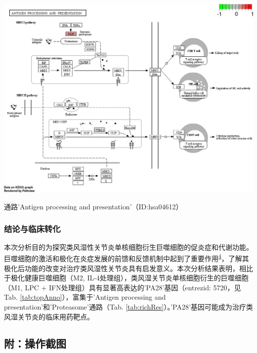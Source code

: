 \documentclass[
]{article}
\begin{document}
\bgroup {}
\includegraphics[width=14.88in]{thesis_fig/hsa04612.pathview} \caption{通路'Antigen processing and presentation'（ID:hsa04612）}\label{fig:fig10}
\makeatletter \egroup

\hypertarget{ux7ed3ux8bbaux4e0eux4e34ux5e8aux8f6cux5316}{%
\subsubsection{结论与临床转化}\label{ux7ed3ux8bbaux4e0eux4e34ux5e8aux8f6cux5316}}

本次分析目的为探究类风湿性关节炎单核细胞衍生巨噬细胞的促炎症和代谢功能。巨噬细胞的激活和极化在炎症发展的前馈和反馈机制中起到了重要作用\textsuperscript{\protect\hyperlink{ref-hu_regulation_2008}{4}}，了解其极化后功能的改变对治疗类风湿性关节炎具有启发意义。本次分析结果表明，相比于极化健康巨噬细胞（M2, IL-4处理组），类风湿关节炎单核细胞衍生的巨噬细胞（M1, LPC + IFN处理组）具有显著高表达的'PA28'基因（entrezid: 5720，见Tab. \ref{tab:topAnno}），富集于'Antigen processing and presentation'和'Proteasome'通路（Tab. \ref{tab:richRes}）。'PA28'基因可能成为治疗类风湿关节炎的临床用药靶点。

\hypertarget{ux9644ux64cdux4f5cux622aux56fe}{%
\subsection{附：操作截图}\label{ux9644ux64cdux4f5cux622aux56fe}}
\end{document}
